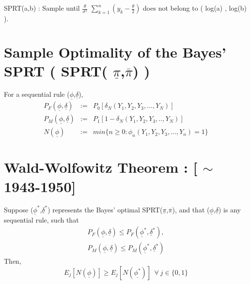 \documentclass[12pt]{report}
\begin{document}
SPRT(a,b) :  Sample until $\frac{\theta}{\sigma^{2}}$ $ \sum^{n}_{k=1} ( y_k -\frac{\theta}{2} )$ does not belong to ( log(a) , log(b) ).

\section{Sample Optimality of the Bayes' SPRT ( SPRT( $\underline{\pi}$,$\overline{\pi}$) )}

For a sequential rule ($\underline{\phi}$,$\underline{\delta}$),
\newline
\begin{eqnarray}
P_{F}(\underline{\phi},\underline{\delta})&:=&\textit{P}_{0}[\delta_{N}(Y_1,Y_2,Y_3,...,Y_N)]\\
P_{M}(\underline{\phi},\underline{\delta}) &:=& \textit{P}_{1}[1 - \delta_{N}(Y_1,Y_2,Y_3,..,Y_N)]\\
N(\underline{\phi})&:=& min\lbrace n \geq 0 : \phi_{n}(Y_1,Y_2,Y_3,...,Y_n) = 1\rbrace
\end{eqnarray}
\section{Wald-Wolfowitz Theorem : [ $\sim$ 1943-1950]}
Suppose ($\underline{\phi}^{*}$,$\underline{\delta}^{*}$) represents the Bayes' optimal SPRT($\underline{\pi}$,$\overline{\pi}$), and that ($\underline{\phi}$,$\underline{\delta}$) is any sequential rule, such that 
\begin{eqnarray}
P_{F}(\underline{\phi},\underline{\delta}) \leq P_{F}(\underline{\phi}^{*},\underline{\delta}^{*}),\\
P_{M}(\underline{\phi},\underline{\delta}) \leq P_{M}(\underline{\phi}^{*},\underline{\delta}^{*})
\end{eqnarray}
Then,
\begin{equation}
\textit{E}_{j} [N(\underline{\phi})] \geq \textit{E}_{j} [N(\underline{\phi^{*}})] \ \ \forall \ j\in \lbrace 0 , 1\rbrace
\end{equation}
\newline
\newline
\end{document}
